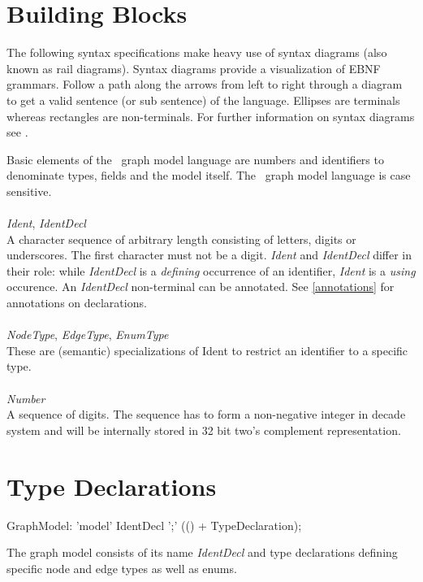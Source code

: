 \section{Building Blocks}
\label{modelbb}

\begin{note}
The following syntax specifications make heavy use of syntax diagrams (also known as rail diagrams). Syntax diagrams provide a visualization of EBNF grammars. Follow a path along the arrows from left to right through a diagram to get a valid sentence (or sub sentence) of the language. Ellipses are terminals whereas rectangles are non-terminals. For further information on syntax diagrams see \cite{pascal}.
\end{note}
Basic elements of the \GrG\ graph model language are numbers and identifiers to denominate types, fields and the model itself. The \GrG\ graph model language is case sensitive.\\
\\
\emph{Ident}, \emph{IdentDecl}\\ \nopagebreak
A character sequence of arbitrary length consisting of letters, digits or underscores. The first character must not be a digit. \emph{Ident} and \emph{IdentDecl} differ in their role: while \emph{IdentDecl} is a \emph{defining} occurrence of an identifier, \emph{Ident} is a \emph{using} occurence. An \emph{IdentDecl} non-terminal can be annotated. See \ref{annotations} for annotations on declarations.\\
\\
\emph{NodeType}, \emph{EdgeType}, \emph{EnumType}\\ \nopagebreak
These are (semantic) specializations of Ident to restrict an identifier to a specific type.\\
\\
\emph{Number}\\ \nopagebreak
A sequence of digits. The sequence has to form a non-negative integer in decade system and will be internally stored in 32 bit two's complement representation.

\section{Type Declarations}
\begin{rail}
  GraphModel: 'model' IdentDecl ';' (() + TypeDeclaration);
\end{rail}
The graph model consists of its name \emph{IdentDecl} and type declarations defining specific node and edge types as well as enums.


